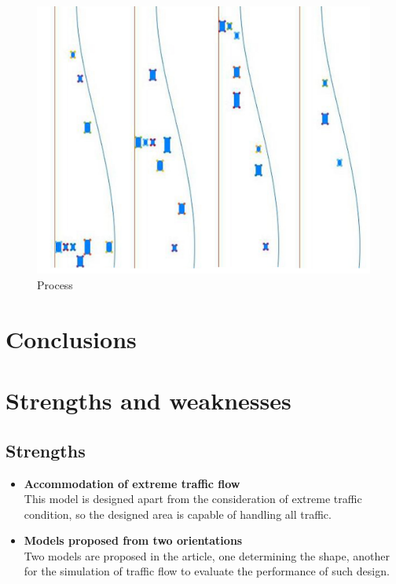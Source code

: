 \documentclass{mcmthesis}
\begin{document}
\begin{figure}[H]
{\begin{minipage}[b]{0.65\textwidth}
			\includegraphics[width=1\textwidth]{process3.jpg}
		\end{minipage}
	}
		\caption{Process} \label{process}
	\end{figure}



\section{Conclusions}


\section{Strengths and weaknesses}


\subsection{Strengths}
\begin{itemize}
\item \textbf{Accommodation of extreme traffic flow}\\ This model is designed apart from the consideration of extreme traffic condition, so the designed area is capable of handling all traffic.
\item \textbf{Models proposed from two orientations}\\ Two models are proposed in the article, one determining the shape, another for the simulation of traffic flow to evaluate the performance of such design.

\end{itemize}
\end{document}
